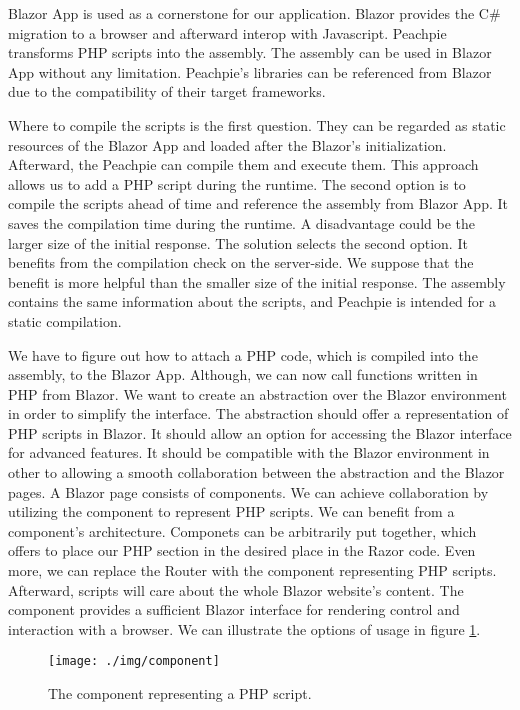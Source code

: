 Blazor App is used as a cornerstone for our application.
Blazor provides the C\# migration to a browser and afterward interop with Javascript.
Peachpie transforms PHP scripts into the assembly.
The assembly can be used in Blazor App without any limitation.
Peachpie's libraries can be referenced from Blazor due to the compatibility of their target frameworks.
\par
Where to compile the scripts is the first question.
They can be regarded as static resources of the Blazor App and loaded after the Blazor's initialization.
Afterward, the Peachpie can compile them and execute them.
This approach allows us to add a PHP script during the runtime.
The second option is to compile the scripts ahead of time and reference the assembly from Blazor App.
It saves the compilation time during the runtime.
A disadvantage could be the larger size of the initial response.
The solution selects the second option.
It benefits from the compilation check on the server-side.
We suppose that the benefit is more helpful than the smaller size of the initial response.
The assembly contains the same information about the scripts, and Peachpie is intended for a static compilation.
\par
We have to figure out how to attach a PHP code, which is compiled into the assembly, to the Blazor App.
Although, we can now call functions written in PHP from Blazor.
We want to create an abstraction over the Blazor environment in order to simplify the interface.
The abstraction should offer a representation of PHP scripts in Blazor.
It should allow an option for accessing the Blazor interface for advanced features.
It should be compatible with the Blazor environment in other to allowing a smooth collaboration between the abstraction and the Blazor pages.
A Blazor page consists of components.
We can achieve collaboration by utilizing the component to represent PHP scripts.
We can benefit from a component's architecture.
Componets can be arbitrarily put together, which offers to place our PHP section in the desired place in the Razor code.
Even more, we can replace the Router with the component representing PHP scripts.
Afterward, scripts will care about the whole Blazor website's content.
The component provides a sufficient Blazor interface for rendering control and interaction with a browser. 
We can illustrate the options of usage in figure \ref{img02:component}.
\par
\begin{figure}[H]\centering
\texttt{[image: ./img/component]}
\caption{The component representing a PHP script.}
\label{img02:component}
\end{figure} 
